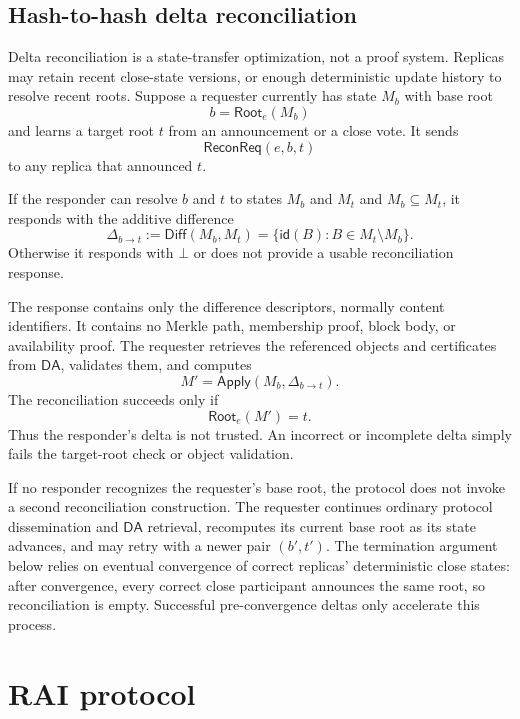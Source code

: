 \documentclass[11pt]{article}
\theoremstyle{remark}
\newcommand{\Root}{\mathsf{Root}}
\newcommand{\Diff}{\mathsf{Diff}}
\newcommand{\Apply}{\mathsf{Apply}}
\newcommand{\ReconReq}{\mathsf{ReconReq}}
\newcommand{\id}{\mathsf{id}}
\newcommand{\DA}{\mathsf{DA}}
\begin{document}
\subsection{Hash-to-hash delta reconciliation}
\label{subsec:reconciliation}

Delta reconciliation is a state-transfer optimization, not a proof system. Replicas may retain recent close-state versions, or enough deterministic update history to resolve recent roots. Suppose a requester currently has state $M_b$ with base root
\[
  b=\Root_e(M_b)
\]
and learns a target root $t$ from an announcement or a close vote. It sends
\[
  \ReconReq(e,b,t)
\]
to any replica that announced $t$.

If the responder can resolve $b$ and $t$ to states $M_b$ and $M_t$ and $M_b\subseteq M_t$, it responds with the additive difference
\begin{equation}
  \Delta_{b\to t}
  :=
  \Diff(M_b,M_t)
  =
  \{\id(B): B\in M_t\setminus M_b\}.
  \label{eq:delta}
\end{equation}
Otherwise it responds with $\bot$ or does not provide a usable reconciliation response.

The response contains only the difference descriptors, normally content identifiers. It contains no Merkle path, membership proof, block body, or availability proof. The requester retrieves the referenced objects and certificates from $\DA$, validates them, and computes
\[
  M' = \Apply(M_b,\Delta_{b\to t}).
\]
The reconciliation succeeds only if
\begin{equation}
  \Root_e(M')=t.
  \label{eq:recon-check}
\end{equation}
Thus the responder's delta is not trusted. An incorrect or incomplete delta simply fails the target-root check or object validation.

If no responder recognizes the requester's base root, the protocol does not invoke a second reconciliation construction. The requester continues ordinary protocol dissemination and $\DA$ retrieval, recomputes its current base root as its state advances, and may retry with a newer pair $(b',t')$. The termination argument below relies on eventual convergence of correct replicas' deterministic close states: after convergence, every correct close participant announces the same root, so reconciliation is empty. Successful pre-convergence deltas only accelerate this process.

\section{RAI protocol}
\end{document}
